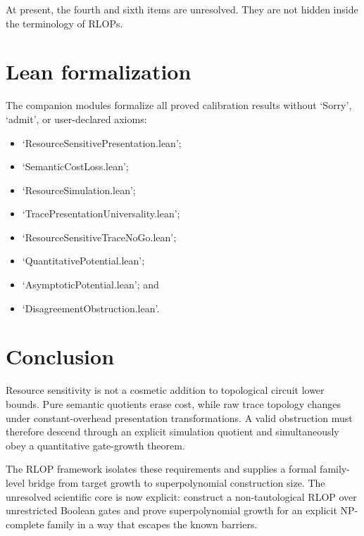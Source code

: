 \documentclass[11pt]{article}
\theoremstyle{definition}
\begin{document}
At present, the fourth and sixth items are unresolved.  They are not hidden
inside the terminology of RLOPs.

\section{Lean formalization}

The companion modules formalize all proved calibration results without
`Sorry', `admit', or user-declared axioms:
\begin{itemize}[leftmargin=*]
\item `ResourceSensitivePresentation.lean';
\item `SemanticCostLoss.lean';
\item `ResourceSimulation.lean';
\item `TracePresentationUniversality.lean';
\item `ResourceSensitiveTraceNoGo.lean';
\item `QuantitativePotential.lean';
\item `AsymptoticPotential.lean'; and
\item `DisagreementObstruction.lean'.
\end{itemize}

\section{Conclusion}

Resource sensitivity is not a cosmetic addition to topological circuit
lower bounds.  Pure semantic quotients erase cost, while raw trace topology
changes under constant-overhead presentation transformations.  A valid
obstruction must therefore descend through an explicit simulation quotient
and simultaneously obey a quantitative gate-growth theorem.

The RLOP framework isolates these requirements and supplies a formal
family-level bridge from target growth to superpolynomial construction size.
The unresolved scientific core is now explicit: construct a non-tautological
RLOP over unrestricted Boolean gates and prove superpolynomial growth for an
explicit NP-complete family in a way that escapes the known barriers.
\end{document}
